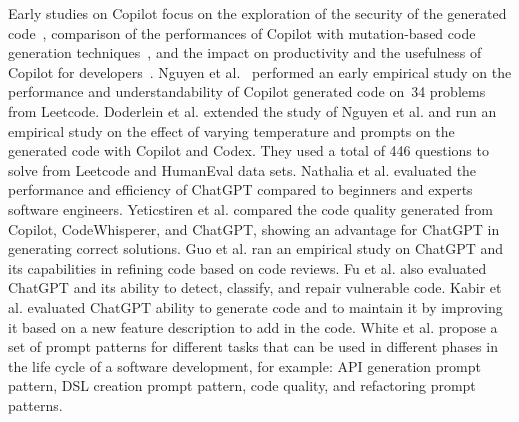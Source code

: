   Early studies on Copilot focus on the exploration of the security of the generated code~\cite{pearce2022asleep}, comparison of the performances of Copilot with mutation-based code generation techniques~\cite{sobania2022choose}, and  the impact on productivity and the usefulness of Copilot for developers~\cite{ziegler2022productivity,vaithilingam2022expectation}.
  Nguyen et al.~\cite{nguyen2022empirical} performed an early empirical study on the performance and understandability of Copilot generated code on~34 problems from Leetcode. 
  Doderlein et al. \cite{doderlein2022piloting} extended the study of Nguyen et al. \cite{nguyen2022empirical} and run an empirical study on the effect of varying temperature and prompts on the generated code with Copilot and Codex. They used a total of 446 questions to solve from Leetcode and HumanEval data sets.  
  Nathalia et al. \cite{nathalia2023artificial} evaluated the performance and efficiency of ChatGPT compared to beginners and experts software engineers. 
  Yeticstiren et al. \cite{yeticstiren2023evaluating} compared the code quality generated from Copilot, CodeWhisperer, and ChatGPT, showing an advantage for ChatGPT in generating correct solutions. 
  Guo et al. \cite{guo2023exploring} ran an empirical study on ChatGPT and its capabilities in refining code based on code reviews. 
  Fu et al. \cite{fu2023chatgpt} also evaluated ChatGPT and its ability to detect, classify, and repair vulnerable code. 
  Kabir et al. \cite{kabir2023empirical} evaluated ChatGPT ability to generate code and to maintain it by improving it based on a new feature description to add in the code.  
 White et al. \cite{White2024} propose a set of prompt patterns for different tasks that can be used in different phases in the life cycle of a software development, for example: API generation prompt pattern, DSL creation prompt pattern, code quality, and refactoring prompt patterns.%
 
